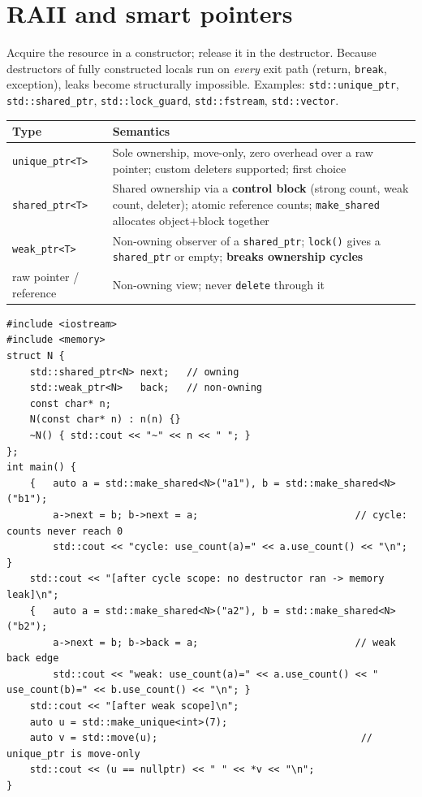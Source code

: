 \documentclass[10pt,a4paper,openany,oneside]{report}
\newcommand{\prio}[1]{\texorpdfstring{\ifcase#1\or{\color{gold}\ding{72}}\or{\color{gold}\ding{72}\ding{72}}\or{\color{gold}\ding{72}\ding{72}\ding{72}}\fi}{}}
\begin{document}
\section{RAII and smart pointers \prio{3}}
\begin{mustbox}[RAII = Resource Acquisition Is Initialisation]
Acquire the resource in a constructor; release it in the destructor. Because destructors of fully constructed locals run on \emph{every} exit path (return, \texttt{break}, exception), leaks become structurally impossible. Examples: \texttt{std::unique\_ptr}, \texttt{std::shared\_ptr}, \texttt{std::lock\_guard}, \texttt{std::fstream}, \texttt{std::vector}.
\end{mustbox}
\begin{center}\small
\begin{xltabular}{\textwidth}{@{}L{3.2cm}Y@{}}
\toprule
\textbf{Type} & \textbf{Semantics}\\
\midrule\endhead
\texttt{unique\_ptr<T>} & Sole ownership, move-only, zero overhead over a raw pointer; custom deleters supported; first choice\\
\texttt{shared\_ptr<T>} & Shared ownership via a \textbf{control block} (strong count, weak count, deleter); atomic reference counts; \texttt{make\_shared} allocates object+block together\\
\texttt{weak\_ptr<T>} & Non-owning observer of a \texttt{shared\_ptr}; \texttt{lock()} gives a \texttt{shared\_ptr} or empty; \textbf{breaks ownership cycles}\\
raw pointer / reference & Non-owning view; never \texttt{delete} through it\\
\bottomrule
\end{xltabular}
\end{center}
\begin{lstlisting}[language={[11]C++},title={shared\_ptr cycle leaks; weak\_ptr back-reference fixes it}]
#include <iostream>
#include <memory>
struct N {
    std::shared_ptr<N> next;   // owning
    std::weak_ptr<N>   back;   // non-owning
    const char* n;
    N(const char* n) : n(n) {}
    ~N() { std::cout << "~" << n << " "; }
};
int main() {
    {   auto a = std::make_shared<N>("a1"), b = std::make_shared<N>("b1");
        a->next = b; b->next = a;                           // cycle: counts never reach 0
        std::cout << "cycle: use_count(a)=" << a.use_count() << "\n"; }
    std::cout << "[after cycle scope: no destructor ran -> memory leak]\n";
    {   auto a = std::make_shared<N>("a2"), b = std::make_shared<N>("b2");
        a->next = b; b->back = a;                           // weak back edge
        std::cout << "weak: use_count(a)=" << a.use_count() << " use_count(b)=" << b.use_count() << "\n"; }
    std::cout << "[after weak scope]\n";
    auto u = std::make_unique<int>(7);
    auto v = std::move(u);                                   // unique_ptr is move-only
    std::cout << (u == nullptr) << " " << *v << "\n";
}
\end{lstlisting}
\end{document}
